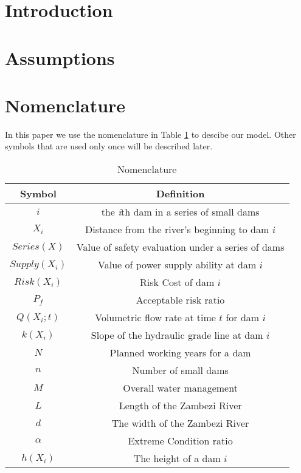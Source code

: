 \documentclass{mcmthesis}
\begin{document}
\maketitle

\tableofcontents

\newpage

\section{Introduction}	

\section{Assumptions}\label{Sec-Assume}

\section{Nomenclature}\label{Sec-Nomen}
In this paper we use the nomenclature in Table \ref{tab:Nomen} to descibe our model. Other symbols that are used only once will be described later.
\begin{table}
    \centering
    \caption{Nomenclature}
    \label{tab:Nomen}
    \begin{tabular}{c c}
\hline
    	Symbol & Definition\\
\hline
	$i$ & the \emph{i}th dam in a series of small dams\\
	$X_i$ & Distance from the river's beginning to dam $i$\\
	$Series(X)$ & Value of safety evaluation under a series of dams\\
	$Supply(X_i)$ & Value of power supply ability at dam $i$\\
	$Risk(X_i)$ & Risk Cost of dam $i$\\
	$P_f$ & Acceptable risk ratio\\
	$Q(X_i;t)$ & Volumetric flow rate at time $t$ for dam $i$\\
	$k(X_i)$ & Slope of the hydraulic grade line at dam $i$\\
	$N$ & Planned working years for a dam\\
	$n$ & Number of small dams\\
	$M$ & Overall water management\\
	$L$ & Length of the Zambezi River\\
	$d$ & The width of the Zambezi River\\
	$\alpha$& Extreme Condition ratio\\
	$h(X_i)$ & The height of a dam $i$\\
\hline
    \end{tabular}
\end{table}
\end{document}
